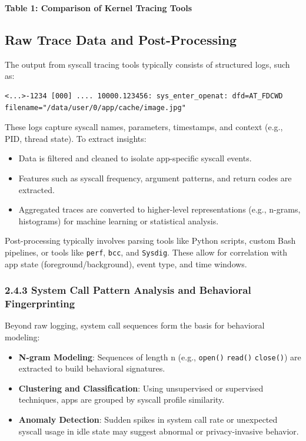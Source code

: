\documentclass[a4paper,12pt]{report}
\begin{document}
\textbf{Table 1: Comparison of Kernel Tracing Tools}


\subsection{Raw Trace Data and Post-Processing}
The output from syscall tracing tools typically consists of structured logs, such as:

\begin{verbatim}
<...>-1234 [000] .... 10000.123456: sys_enter_openat: dfd=AT_FDCWD filename="/data/user/0/app/cache/image.jpg"
\end{verbatim}

These logs capture syscall names, parameters, timestamps, and context (e.g., PID, thread state). To extract insights:

\begin{itemize}
\item Data is filtered and cleaned to isolate app-specific syscall events.
\item Features such as syscall frequency, argument patterns, and return codes are extracted.
\item Aggregated traces are converted to higher-level representations (e.g., n-grams, histograms) for machine learning or statistical analysis.
\end{itemize}

Post-processing typically involves parsing tools like Python scripts, custom Bash pipelines, or tools like \texttt{perf}, \texttt{bcc}, and \texttt{Sysdig}. These allow for correlation with app state (foreground/background), event type, and time windows.

\subsubsection*{2.4.3 System Call Pattern Analysis and Behavioral Fingerprinting}
Beyond raw logging, system call sequences form the basis for behavioral modeling:

\begin{itemize}
\item \textbf{N-gram Modeling}: Sequences of length n (e.g., \texttt{open()}  \texttt{read()}  \texttt{close()}) are extracted to build behavioral signatures.
\item \textbf{Clustering and Classification}: Using unsupervised or supervised techniques, apps are grouped by syscall profile similarity.
\item \textbf{Anomaly Detection}: Sudden spikes in system call rate or unexpected syscall usage in idle state may suggest abnormal or privacy-invasive behavior.
\end{itemize}
\end{document}
